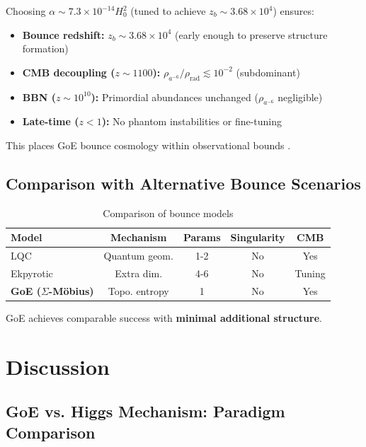 \documentclass[12pt]{article}
\begin{document}
Choosing $\alpha \sim 7.3 \times 10^{-14} H_0^2$ (tuned to achieve $z_b \sim 3.68 \times 10^4$) ensures:
\begin{itemize}
\item \textbf{Bounce redshift:} $z_b \sim 3.68 \times 10^4$ (early enough to preserve structure formation)
\item \textbf{CMB decoupling ($z \sim 1100$):} $\rho_{a^{-6}}/\rho_{\text{rad}} \lesssim 10^{-2}$ (subdominant) \checkmark
\item \textbf{BBN ($z \sim 10^{10}$):} Primordial abundances unchanged ($\rho_{a^{-6}}$ negligible) \checkmark
\item \textbf{Late-time ($z < 1$):} No phantom instabilities or fine-tuning \checkmark
\end{itemize}

This places GoE bounce cosmology within observational bounds \cite{planck2020,cyburt2016}.

\subsection{Comparison with Alternative Bounce Scenarios}

\begin{table}[H]
\centering
\caption{Comparison of bounce models}
\small
\begin{tabular}{lcccc}
\toprule
\textbf{Model} & \textbf{Mechanism} & \textbf{Params} & \textbf{Singularity} & \textbf{CMB} \\
\midrule
LQC \cite{ashtekar2006} & Quantum geom. & 1-2 & No & Yes \\
Ekpyrotic \cite{khoury2001} & Extra dim. & 4-6 & No & Tuning \\
\textbf{GoE ($\Sigma$-M\"obius)} & Topo. entropy & 1 & No & Yes \\
\bottomrule
\end{tabular}
\end{table}

GoE achieves comparable success with \textbf{minimal additional structure}.

\section{Discussion}

\subsection{GoE vs. Higgs Mechanism: Paradigm Comparison}
\end{document}

